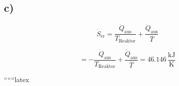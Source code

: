 

\subsection*{c)}

\[
\dot{S}_{\text{er}} = \frac{\dot{Q}_{\text{aus}}}{T_{\text{Reaktor}}} + \frac{\dot{Q}_{\text{aus}}}{\overline{T}}
\]

\[
= -\frac{\dot{Q}_{\text{aus}}}{T_{\text{Reaktor}}} + \frac{\dot{Q}_{\text{aus}}}{\overline{T}} = 46.146 \, \frac{\text{kJ}}{\text{K}}
\]

``````latex